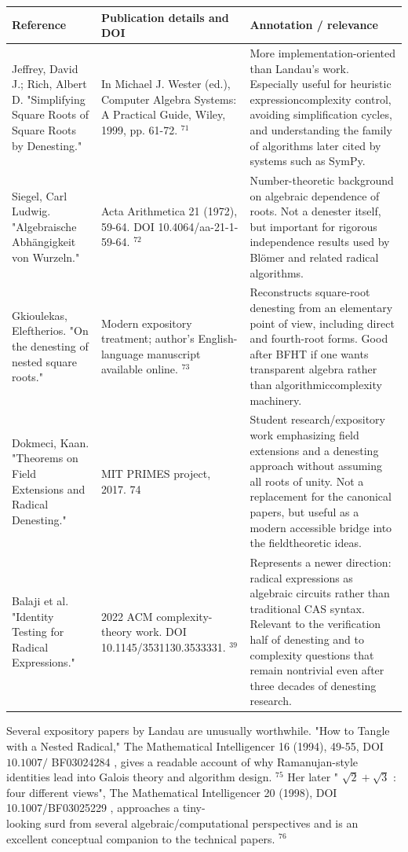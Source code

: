 \documentclass[10pt]{article}
\begin{document}
\begin{center}
\begin{tabular}[t]{|l|l|l|}
\hline
Reference & Publication details and DOI & Annotation / relevance \\
\hline
Jeffrey, David J.; Rich, Albert D. "Simplifying Square Roots of Square Roots by Denesting." & In Michael J. Wester (ed.), Computer Algebra Systems: A Practical Guide, Wiley, 1999, pp. 61-72. ${ }^{71}$ & More implementation-oriented than Landau's work. Especially useful for heuristic expressioncomplexity control, avoiding simplification cycles, and understanding the family of algorithms later cited by systems such as SymPy. \\
\hline
Siegel, Carl Ludwig. "Algebraische Abhängigkeit von Wurzeln." & Acta Arithmetica 21 (1972), 59-64. DOI 10.4064/aa-21-1-59-64. ${ }^{72}$ & Number-theoretic background on algebraic dependence of roots. Not a denester itself, but important for rigorous independence results used by Blömer and related radical algorithms. \\
\hline
Gkioulekas, Eleftherios. "On the denesting of nested square roots." & Modern expository treatment; author's English-language manuscript available online. ${ }^{73}$ & Reconstructs square-root denesting from an elementary point of view, including direct and fourth-root forms. Good after BFHT if one wants transparent algebra rather than algorithmiccomplexity machinery. \\
\hline
Dokmeci, Kaan. "Theorems on Field Extensions and Radical Denesting." & MIT PRIMES project, 2017. 74 & Student research/expository work emphasizing field extensions and a denesting approach without assuming all roots of unity. Not a replacement for the canonical papers, but useful as a modern accessible bridge into the fieldtheoretic ideas. \\
\hline
Balaji et al. "Identity Testing for Radical Expressions." & 2022 ACM complexity-theory work. DOI 10.1145/3531130.3533331. ${ }^{39}$ & Represents a newer direction: radical expressions as algebraic circuits rather than traditional CAS syntax. Relevant to the verification half of denesting and to complexity questions that remain nontrivial even after three decades of denesting research. \\
\hline
\end{tabular}
\end{center}

Several expository papers by Landau are unusually worthwhile. "How to Tangle with a Nested Radical," The Mathematical Intelligencer 16 (1994), 49-55, DOI $10.1007 /$ BF03024284 , gives a readable account of why Ramanujan-style identities lead into Galois theory and algorithm design. ${ }^{75}$ Her later " $\sqrt{2}+\sqrt{3}$ : four different views", The Mathematical Intelligencer 20 (1998), DOI 10.1007/BF03025229 , approaches a tiny-\\
looking surd from several algebraic/computational perspectives and is an excellent conceptual companion to the technical papers. ${ }^{76}$
\end{document}
